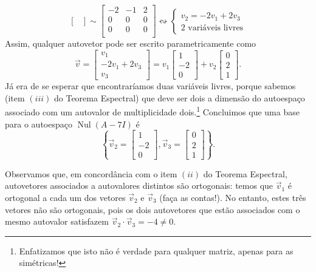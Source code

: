 \documentclass[../livro.tex]{subfiles}
\begin{document}
\begin{example}
\begin{itemize}
\begin{equation}
\begin{bmatrix}
		\end{bmatrix} \sim 
		\begin{bmatrix}
		-2 & -1 & 2 \\
		0 & 0 & 0 \\  
		0 & 0 & 0 \\
		\end{bmatrix} \leftrightsquigarrow
		\left\lbrace 
		\begin{array}{l}
		v_2 = - 2 v_1 + 2 v_3  \\
		\text{2 variáveis livres}
		\end{array}
		\right. 
		\end{equation} Assim, qualquer autovetor pode ser escrito parametricamente como
		\begin{equation}
		\vec{v} = 
		\begin{bmatrix}
		v_1 \\
		- 2 v_1 + 2v_3 \\
		v_3
		\end{bmatrix} = v_1 
		\begin{bmatrix}
		1 \\ -2 \\ 0
		\end{bmatrix} + v_2
		\begin{bmatrix}
		0 \\ 2 \\ 1
		\end{bmatrix}.
		\end{equation} Já era de se esperar que encontraríamos duas variáveis livres, porque sabemos (item $(iii)$ do Teorema Espectral) que deve ser dois a dimensão do autoespaço associado com um autovalor de multiplicidade dois.\footnote{Enfatizamos que isto não é verdade para qualquer matriz, apenas para as simétricas!} Concluimos que uma base para o autoespaço $\operatorname{Nul} (A - 7I)$ é
		\begin{equation}
		\left\lbrace
		\vec{v}_2 = \begin{bmatrix}
		1 \\ -2 \\ 0
		\end{bmatrix}, \vec{v}_3 = 
		\begin{bmatrix}
		0 \\ 2 \\ 1
		\end{bmatrix}
		\right\rbrace.
		\end{equation}
	\end{itemize}
	
	Observamos que, em concordância com o item $(ii)$ do Teorema Espectral, autovetores associados a autovalores distintos são ortogonais: temos que $\vec{v}_1$ é ortogonal a cada um dos vetores $\vec{v}_2$ e $\vec{v}_3$ (faça as contas!). No entanto, estes três vetores não são ortogonais, pois os dois autovetores que estão associados com o mesmo autovalor satisfazem $\vec{v}_2 \cdot \vec{v}_3 = -4 \neq 0.$
	

\end{example}
\end{document}
